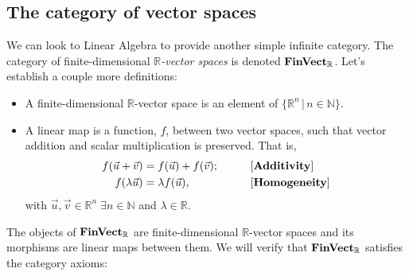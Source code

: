 \documentclass[10pt,a4paper,reqno]{amsart}
\numberwithin{figure}{section}
\begin{document}
\subsection{The category of vector spaces}
We can look to Linear Algebra to provide another simple infinite category. The
category of finite-dimensional $\mathbb{R}$\emph{-vector spaces} is denoted
$\operatorname{\mathbf{FinVect}_\mathbb{R}}$. Let's establish a couple more definitions:
\begin{itemize}
        \item A finite-dimensional $\mathbb{R}$-vector space is an element of
                $\{ \mathbb{R} ^n \, | \, n \in \mathbb{N} \}$.
        \item A linear map is a function, $f$, between two vector spaces,
                such that vector addition and scalar multiplication is
                preserved. That is,
                \begin{alignat*}{2}
                        f( \vec{u} + \vec{v} ) &= f( \vec{u} ) + f( \vec{v} );
                        \qquad && \text{[\textbf{Additivity}]} \\
                        f( \lambda \vec{u} ) &= \lambda f( \vec{u} ),
                        \qquad && \text{[\textbf{Homogeneity}]}
                \end{alignat*}
                with $\vec{u},\vec{v} \in \mathbb{R} ^n \; \exists n \in \mathbb{N}$
                and $\lambda \in \mathbb{R}$.
\end{itemize}
The objects of $\operatorname{\mathbf{FinVect}_\mathbb{R}}$ are finite-dimensional $\mathbb{R}$-vector spaces
and its morphisms are linear maps between them. We will verify that
$\operatorname{\mathbf{FinVect}_\mathbb{R}}$ satisfies the category axioms: 
\end{document}
